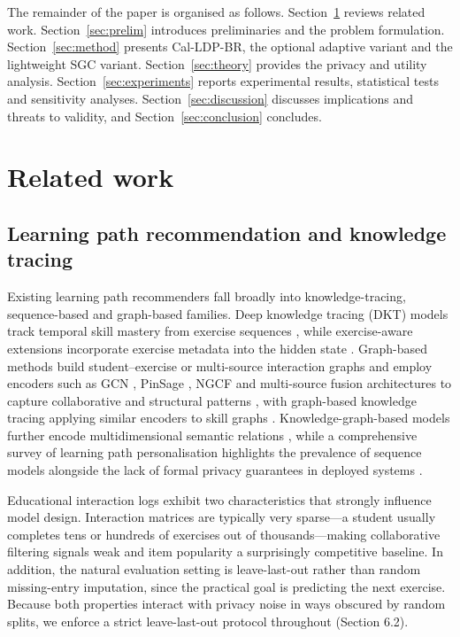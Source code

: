 \documentclass[pdflatex,sn-basic,Numbered]{sn-jnl}
\theoremstyle{plain}
\theoremstyle{remark}
\theoremstyle{definition}
\begin{document}
The remainder of the paper is organised as follows. Section~\ref{sec:related} reviews related work. Section~\ref{sec:prelim} introduces preliminaries and the problem formulation. Section~\ref{sec:method} presents Cal-LDP-BR, the optional adaptive variant and the lightweight SGC variant. Section~\ref{sec:theory} provides the privacy and utility analysis. Section~\ref{sec:experiments} reports experimental results, statistical tests and sensitivity analyses. Section~\ref{sec:discussion} discusses implications and threats to validity, and Section~\ref{sec:conclusion} concludes.

\section{Related work}\label{sec:related}

\subsection{Learning path recommendation and knowledge tracing}

Existing learning path recommenders fall broadly into knowledge-tracing, sequence-based and graph-based families. Deep knowledge tracing (DKT) models track temporal skill mastery from exercise sequences \cite{piech2015dkt}, while exercise-aware extensions incorporate exercise metadata into the hidden state \cite{liu2021ekt}. Graph-based methods build student--exercise or multi-source interaction graphs and employ encoders such as GCN \cite{kipf2017gcn}, PinSage \cite{ying2018pinsage}, NGCF \cite{wang2019ngcf} and multi-source fusion architectures \cite{cheng2019friend} to capture collaborative and structural patterns \cite{wu2021gnnsurvey,zhang2019survey}, with graph-based knowledge tracing applying similar encoders to skill graphs \cite{nakagawa2019gkt}. Knowledge-graph-based models further encode multidimensional semantic relations \cite{shi2020learningpath}, while a comprehensive survey of learning path personalisation highlights the prevalence of sequence models alongside the lack of formal privacy guarantees in deployed systems \cite{nabizadeh2020survey}.

Educational interaction logs exhibit two characteristics that strongly influence model design. Interaction matrices are typically very sparse---a student usually completes tens or hundreds of exercises out of thousands---making collaborative filtering signals weak and item popularity a surprisingly competitive baseline. In addition, the natural evaluation setting is leave-last-out rather than random missing-entry imputation, since the practical goal is predicting the next exercise. Because both properties interact with privacy noise in ways obscured by random splits, we enforce a strict leave-last-out protocol throughout (Section 6.2).
\end{document}
